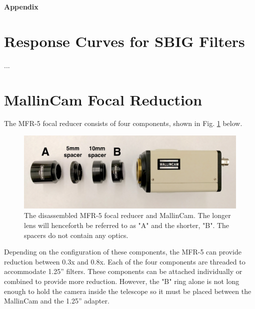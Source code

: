 \documentclass[12pt,titlepage]{article}
\begin{document}
\newpage
\begin{flushleft}
\textbf{\Large Appendix}
\end{flushleft}
\begin{appendix}

\setcounter{table}{0}   %
\renewcommand{\thetable}{\thesection\arabic{table}}  %
\setcounter{figure}{0}     %
\renewcommand{\thefigure}{\thesection\arabic{figure}}    %


\section{Response Curves for SBIG Filters}
...
\section{MallinCam Focal Reduction}
\label{sssec:focal_reduction}
\par The MFR-5 focal reducer consists of four components, shown in Fig. \ref{mfr5} below.
\begin{figure}[H] 
	\begin{center}
		\includegraphics[width=.8\textwidth]{./images/mallincam/focal_reduction/MFR5_labeled.jpg} 
		\caption{The disassembled MFR-5 focal reducer and MallinCam.
				The longer lens will henceforth be referred to as "A" and the shorter, "B".
				The spacers do not contain any optics.}
		\label{mfr5}
	\end{center}
\end{figure}
\noindent Depending on the configuration of these components, the MFR-5 can provide reduction between 0.3x and 0.8x.
Each of the four components are threaded to accommodate 1.25'' filters.
These components can be attached individually or combined to provide more reduction.
However, the "B" ring alone is not long enough to hold the camera inside the telescope so it must be placed between the MallinCam
and the 1.25'' adapter.
\begin{figure}[H] 
	\begin{center}

\end{center}
\end{figure}
\end{appendix}
\end{document}
